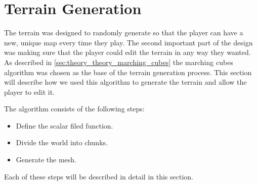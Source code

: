 \section{Terrain Generation} \label{sec:system_architecture_terrain_generation}
The terrain was designed to randomly generate so that the player can have a new, unique map every time they play.
The second important part of the design was making sure that the player could edit the terrain in any way they wanted.
As described in \autoref{sec:theory_theory_marching_cubes} the marching cubes algorithm was chosen as the base of the terrain generation process.
This section will describe how we used this algorithm to generate the terrain and allow the player to edit it.

The algorithm consists of the following steps:
\begin{itemize}
    \item Define the scalar filed function.
    \item Divide the world into chunks.
    \item Generate the mesh.
\end{itemize}

Each of these steps will be described in detail in this section.




